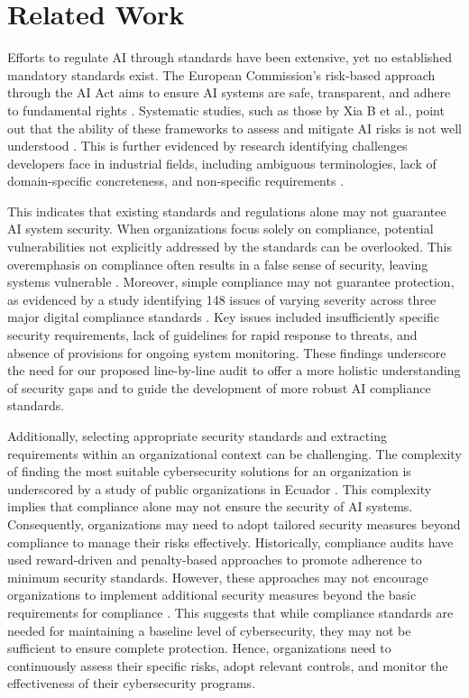 \section{Related Work}
\label{sec:existing_ai_security}
Efforts to regulate AI through standards have been extensive, yet no established mandatory standards exist. The European Commission's risk-based approach through the AI Act aims to ensure AI systems are safe, transparent, and adhere to fundamental rights \cite{Laux2022TrustworthyRisk}. Systematic studies, such as those by Xia B et al., point out that the ability of these frameworks to assess and mitigate AI risks is not well understood \cite{Xia2023TowardsStudyb}. This is further evidenced by research identifying challenges developers face in industrial fields, including ambiguous terminologies, lack of domain-specific concreteness, and non-specific requirements \cite{Hwang2022BridgingDevelopment}.

This indicates that existing standards and regulations alone may not guarantee AI system security. When organizations focus solely on compliance, potential vulnerabilities not explicitly addressed by the standards can be overlooked. This overemphasis on compliance often results in a false sense of security, leaving systems vulnerable \cite{Schneck2019FROMLaws, 2022ComplianceKey}. Moreover, simple compliance may not guarantee protection, as evidenced by a study identifying 148 issues of varying severity across three major digital compliance standards \cite{Stevens2020ComplianceStandards}. Key issues included insufficiently specific security requirements, lack of guidelines for rapid response to threats, and absence of provisions for ongoing system monitoring. These findings underscore the need for our proposed line-by-line audit to offer a more holistic understanding of security gaps and to guide the development of more robust AI compliance standards.

Additionally, selecting appropriate security standards and extracting requirements within an organizational context can be challenging. The complexity of finding the most suitable cybersecurity solutions for an organization is underscored by a study of public organizations in Ecuador \cite{Hamdani2021CybersecuritySystem}. This complexity implies that compliance alone may not ensure the security of AI systems. Consequently, organizations may need to adopt tailored security measures beyond compliance to manage their risks effectively. Historically, compliance audits have used reward-driven and penalty-based approaches to promote adherence to minimum security standards. However, these approaches may not encourage organizations to implement additional security measures beyond the basic requirements for compliance \cite{Cheng2013UnderstandingTheory, Ifinedo2012UnderstandingTheory}. This suggests that while compliance standards are needed for maintaining a baseline level of cybersecurity, they may not be sufficient to ensure complete protection. Hence, organizations need to continuously assess their specific risks, adopt relevant controls, and monitor the effectiveness of their cybersecurity programs.

